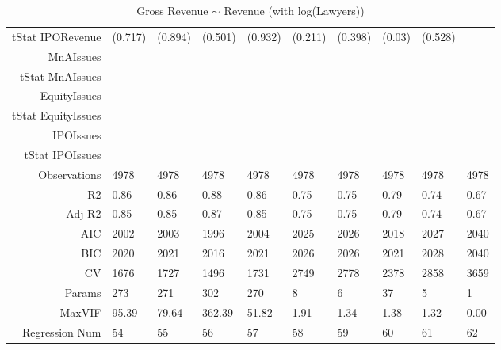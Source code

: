 \begin{table}[ht]
\begin{tabular}{rlllllllll}
  tStat IPORevenue & (0.717) & (0.894) & (0.501) & (0.932) & (0.211) & (0.398) & (0.03) & (0.528) &  \\ 
  MnAIssues &  &  &  &  &  &  &  &  &  \\ 
  tStat MnAIssues &  &  &  &  &  &  &  &  &  \\ 
  EquityIssues &  &  &  &  &  &  &  &  &  \\ 
  tStat EquityIssues &  &  &  &  &  &  &  &  &  \\ 
  IPOIssues &  &  &  &  &  &  &  &  &  \\ 
  tStat IPOIssues &  &  &  &  &  &  &  &  &  \\ 
  Observations & 4978 & 4978 & 4978 & 4978 & 4978 & 4978 & 4978 & 4978 & 4978 \\ 
  R2 & 0.86 & 0.86 & 0.88 & 0.86 & 0.75 & 0.75 & 0.79 & 0.74 & 0.67 \\ 
  Adj R2 & 0.85 & 0.85 & 0.87 & 0.85 & 0.75 & 0.75 & 0.79 & 0.74 & 0.67 \\ 
  AIC & 2002 & 2003 & 1996 & 2004 & 2025 & 2026 & 2018 & 2027 & 2040 \\ 
  BIC & 2020 & 2021 & 2016 & 2021 & 2026 & 2026 & 2021 & 2028 & 2040 \\ 
  CV & 1676 & 1727 & 1496 & 1731 & 2749 & 2778 & 2378 & 2858 & 3659 \\ 
  Params & 273 & 271 & 302 & 270 & 8 & 6 & 37 & 5 & 1 \\ 
  MaxVIF & 95.39 & 79.64 & 362.39 & 51.82 & 1.91 & 1.34 & 1.38 & 1.32 & 0.00 \\ 
  Regression Num & 54 & 55 & 56 & 57 & 58 & 59 & 60 & 61 & 62 \\ 
   \hline
\end{tabular}
\caption{Gross Revenue $\sim$ Revenue (with log(Lawyers))} 
\end{table}
